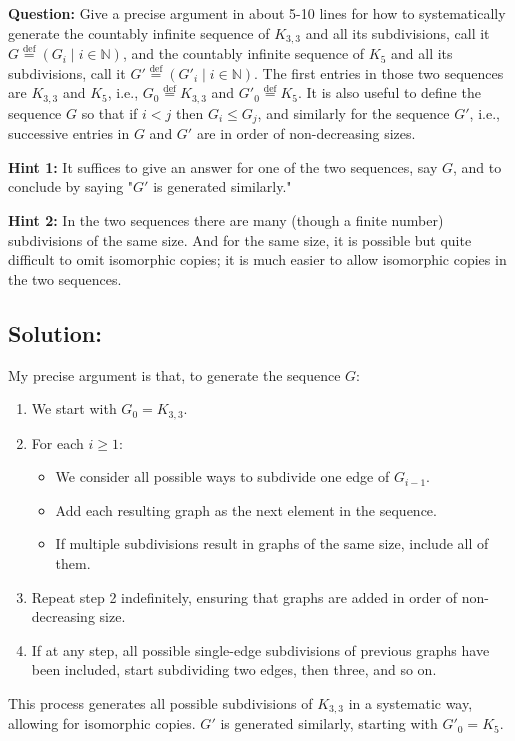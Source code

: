 \documentclass{article}
\begin{document}
\vspace{1em}
\begin{mdframed}
    \textbf{Question:} Give a precise argument in about 5-10 lines for how to systematically generate the countably infinite sequence of $K_{3,3}$ and all its subdivisions, call it $G \stackrel{\text{def}}{=} (G_i \mid i \in \mathbb{N})$, and the countably infinite sequence of $K_5$ and all its subdivisions, call it $G' \stackrel{\text{def}}{=} (G'_i \mid i \in \mathbb{N})$. The first entries in those two sequences are $K_{3,3}$ and $K_5$, i.e., $G_0 \stackrel{\text{def}}{=} K_{3,3}$ and $G'_0 \stackrel{\text{def}}{=} K_5$. It is also useful to define the sequence $G$ so that if $i < j$ then $G_i \leq G_j$, and similarly for the sequence $G'$, i.e., successive entries in $G$ and $G'$ are in order of non-decreasing sizes.

    \vspace{1em}
    \textbf{Hint 1:} It suffices to give an answer for one of the two sequences, say $G$, and to conclude by saying "$G'$ is generated similarly."

    \vspace{1em}
    \textbf{Hint 2:} In the two sequences there are many (though a finite number) subdivisions of the same size. And for the same size, it is possible but quite difficult to omit isomorphic copies; it is much easier to allow isomorphic copies in the two sequences.

    
\end{mdframed}

\subsection*{Solution:}
My precise argument is that, to generate the sequence $G$:

\begin{enumerate}
    \item We start with $G_0 = K_{3,3}$.
    \item For each $i \geq 1$:
        \begin{itemize}
            \item We consider all possible ways to subdivide one edge of $G_{i-1}$.
            \item Add each resulting graph as the next element in the sequence.
            \item If multiple subdivisions result in graphs of the same size, include all of them.
        \end{itemize}
    \item Repeat step 2 indefinitely, ensuring that graphs are added in order of non-decreasing size.
    \item If at any step, all possible single-edge subdivisions of previous graphs have been included, start subdividing two edges, then three, and so on.
\end{enumerate}
This process generates all possible subdivisions of $K_{3,3}$ in a systematic way, allowing for isomorphic copies. $G'$ is generated similarly, starting with $G'_0 = K_5$.
\end{document}

